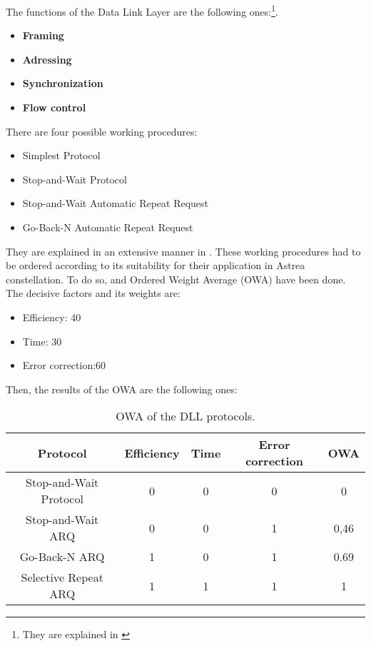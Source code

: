 The functions of the Data Link Layer are the following ones:\footnote{They are explained in \cite[Chapter 1, Section 1]{annex3}}.

\begin{itemize}
\item \textbf{Framing}
\item \textbf{Adressing}
\item \textbf{Synchronization}
\item \textbf{Flow control}
\end{itemize}

There are four possible working procedures:

\begin{itemize}
\item Simplest Protocol
\item Stop-and-Wait Protocol
\item Stop-and-Wait Automatic Repeat Request
\item Go-Back-N Automatic Repeat Request
\end{itemize}

They are explained in an extensive manner in \cite[Chapter 1, Section 1]{annex3}. These working procedures had to be ordered according to its suitability for their application in Astrea constellation. To do so, and Ordered Weight Average (OWA) have been done. The decisive factors and its weights are: 

\begin{itemize}
\item Efficiency: 40
\item Time: 30
\item Error correction:60
\end{itemize}

Then, the results of the OWA are the following ones:

\begin{table}[H]
\begin{center}
\begin{tabular}{ | c | c | c | c | c |}
\hline
Protocol&Efficiency&Time&Error correction&OWA\\
\hline
Stop-and-Wait Protocol&0&0&0&0\\
\hline
Stop-and-Wait ARQ&0&0&1&0,46\\
\hline
Go-Back-N ARQ&1&0&1&0.69\\
\hline
Selective Repeat ARQ&1&1&1&1\\
\hline
\end{tabular}
\caption{OWA of the DLL protocols.}
\end{center}
\end{table} 

